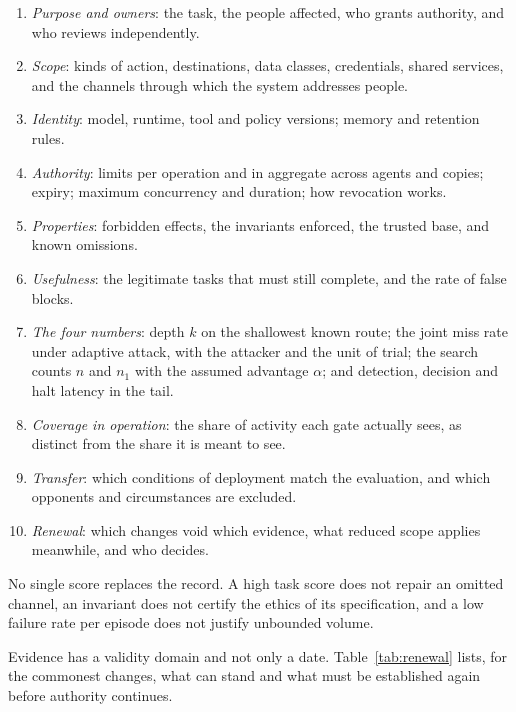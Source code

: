 \documentclass[10pt,twocolumn]{article}
\theoremstyle{plain}
\theoremstyle{definition}
\begin{document}
\begin{enumerate}[itemsep=1pt,topsep=3pt]
\item \emph{Purpose and owners}: the task, the people affected, who grants authority, and who
reviews independently.
\item \emph{Scope}: kinds of action, destinations, data classes, credentials, shared
services, and the channels through which the system addresses people.
\item \emph{Identity}: model, runtime, tool and policy versions; memory and retention rules.
\item \emph{Authority}: limits per operation and in aggregate across agents and copies;
expiry; maximum concurrency and duration; how revocation works.
\item \emph{Properties}: forbidden effects, the invariants enforced, the trusted base, and
known omissions.
\item \emph{Usefulness}: the legitimate tasks that must still complete, and the rate of false
blocks.
\item \emph{The four numbers}: depth $k$ on the shallowest known route; the joint miss rate
under adaptive attack, with the attacker and the unit of trial; the search counts $n$ and
$n_{1}$ with the assumed advantage $\alpha$; and detection, decision and halt latency in the
tail.
\item \emph{Coverage in operation}: the share of activity each gate actually sees, as
distinct from the share it is meant to see.
\item \emph{Transfer}: which conditions of deployment match the evaluation, and which
opponents and circumstances are excluded.
\item \emph{Renewal}: which changes void which evidence, what reduced scope applies
meanwhile, and who decides.
\end{enumerate}
No single score replaces the record. A high task score does not repair an omitted channel,
an invariant does not certify the ethics of its specification, and a low failure rate per
episode does not justify unbounded volume.

Evidence has a validity domain and not only a date. Table~\ref{tab:renewal} lists, for the
commonest changes, what can stand and what must be established again before authority
continues.
\end{document}
